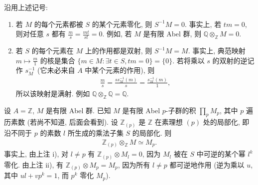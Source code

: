 \begin{remark*}
沿用上述记号:
\begin{enumerate}[label=\roman*)]
\item 若 $M$ 的每个元素都被 $S$ 的某个元素零化, 则 $S^{-1}M=0$. 事实上, 若 $tm=0$, 则对任意 $s$ 都有 $\frac ms=\frac{mt}{st}=0$. 例如, 若 $M$ 是有限 Abel 群, 则 $\mathbb Q\otimes_{\mathbb Z}M=0$.
\item 若 $S$ 的每个元素在 $M$ 上的作用都是双射, 则 $S^{-1}M=M$. 事实上, 典范映射 $m\mapsto\frac m1$ 的核是集合 $\{m\in M:\exists t\in S,tm=0\}=\{0\}$. 若将乘以 $s$ 的双射的逆记作 $s_M^{-1}$ (它未必来自 $A$ 中某个元素的作用), 则
\begin{align*}
\frac ms=\frac{ss_M^{-1}(m)}s=\frac{s_M^{-1}(m)}1,
\end{align*}
所以该映射是满射. 例如 $\mathbb Q\otimes_{\mathbb Z}\mathbb Q=\mathbb Q$.
\end{enumerate}
\end{remark*}
\begin{example*}
设 $A=\mathbb Z$, $M$ 是有限 Abel 群. 已知 $M$ 是有限 Abel $p$-子群的积 $\prod_pM_p$, 其中 $p$ 遍历素数 (若尚不知道, 后面会看到). 设 $\mathbb Z_{(p)}$ 是 $\mathbb Z$ 在素理想 $(p)$ 处的局部化, 即沿不同于 $p$ 的素数 $l$ 所生成的乘法子集 $S$ 的局部化. 则
\begin{align*}
\mathbb Z_{(p)}\otimes_{\mathbb Z}M\simeq M_p.
\end{align*}
事实上, 由上注 i), 对 $l\ne p$ 有 $\mathbb Z_{(p)}\otimes M_l=0$, 因为 $M_l$ 被在 $S$ 中可逆的某个幂 $l^k$ 零化. 由上注 ii), 有 $\mathbb Z_{(p)}\otimes M_p=M_p$, 因为所有 $l\ne p$ 都可逆地作用 (逆为乘以 $u$, 其中 $ul+vp^k=1$, 而 $p^k$ 零化 $M_p$).
\end{example*}

